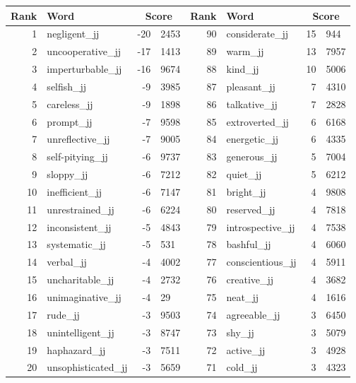 \begin{table}[tbp]
    \begin{tabular}{| rlr@{.}l | rlr@{.}l |}
    \hline
    \textbf{Rank} & \textbf{Word} & \multicolumn{2}{c|}{\textbf{Score}} & \textbf{Rank} & \textbf{Word} & \multicolumn{2}{c|}{\textbf{Score}} \\
    \hline
    1 & negligent\_jj & -20 & 2453    &    90 & considerate\_jj & 15 & 944 \\
    2 & uncooperative\_jj & -17 & 1413    &    89 & warm\_jj & 13 & 7957 \\
    3 & imperturbable\_jj & -16 & 9674    &    88 & kind\_jj & 10 & 5006 \\
    4 & selfish\_jj & -9 & 3985    &    87 & pleasant\_jj & 7 & 4310 \\
    5 & careless\_jj & -9 & 1898    &    86 & talkative\_jj & 7 & 2828 \\
    6 & prompt\_jj & -7 & 9598    &    85 & extroverted\_jj & 6 & 6168 \\
    7 & unreflective\_jj & -7 & 9005    &    84 & energetic\_jj & 6 & 4335 \\
    8 & self-pitying\_jj & -6 & 9737    &    83 & generous\_jj & 5 & 7004 \\
    9 & sloppy\_jj & -6 & 7212    &    82 & quiet\_jj & 5 & 6212 \\
    10 & inefficient\_jj & -6 & 7147    &    81 & bright\_jj & 4 & 9808 \\
    11 & unrestrained\_jj & -6 & 6224    &    80 & reserved\_jj & 4 & 7818 \\
    12 & inconsistent\_jj & -5 & 4843    &    79 & introspective\_jj & 4 & 7538 \\
    13 & systematic\_jj & -5 & 531    &    78 & bashful\_jj & 4 & 6060 \\
    14 & verbal\_jj & -4 & 4002    &    77 & conscientious\_jj & 4 & 5911 \\
    15 & uncharitable\_jj & -4 & 2732    &    76 & creative\_jj & 4 & 3682 \\
    16 & unimaginative\_jj & -4 & 29    &    75 & neat\_jj & 4 & 1616 \\
    17 & rude\_jj & -3 & 9503    &    74 & agreeable\_jj & 3 & 6450 \\
    18 & unintelligent\_jj & -3 & 8747    &    73 & shy\_jj & 3 & 5079 \\
    19 & haphazard\_jj & -3 & 7511    &    72 & active\_jj & 3 & 4928 \\
    20 & unsophisticated\_jj & -3 & 5659    &    71 & cold\_jj & 3 & 4323 \\

\end{tabular}
\end{table}
